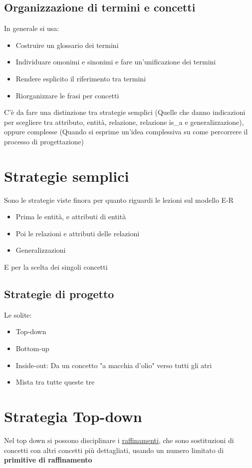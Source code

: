 \documentclass[12pt, a4paper, openany, twoside]{book}
\begin{document}
\subsection{Organizzazione di termini e concetti}
In generale si usa:
\begin{itemize}
	\item Costruire un glossario dei termini
	\item Individuare omonimi e sinonimi e fare un'unificazione dei termini
	\item Rendere esplicito il riferimento tra termini
	\item Riorganizzare le frasi per concetti
\end{itemize}
C'è da fare una distinzione tra strategie semplici (Quelle che danno indicazioni
per scegliere tra attributo, entità, relazione, relazione is\_a e generalizzazione),
oppure complesse (Quando si esprime un'idea complessiva su come percorrere il processo di 
progettazione)
\section{Strategie semplici}
Sono le strategie viste finora per quanto riguardi le lezioni sul modello E-R
\begin{itemize}
	\item Prima le entità, e attributi di entità
	\item Poi le relazioni e attributi delle relazioni
	\item Generalizzazioni
\end{itemize}
E per la scelta dei singoli concetti
\subsection{Strategie di progetto}
Le solite:
\begin{itemize}
	\item Top-down
	\item Bottom-up
	\item Inside-out: Da un concetto "a macchia d'olio" verso tutti gli atri
	\item Mista tra tutte queste tre
\end{itemize}
\section{Strategia Top-down}
Nel top down si possono disciplinare i \underline{raffinamenti}, che sono 
sostituzioni di concetti con altri concetti più dettagliati, usando un numero
limitato di \color{red}\textbf{primitive di raffinamento}\color{black}
\end{document}
